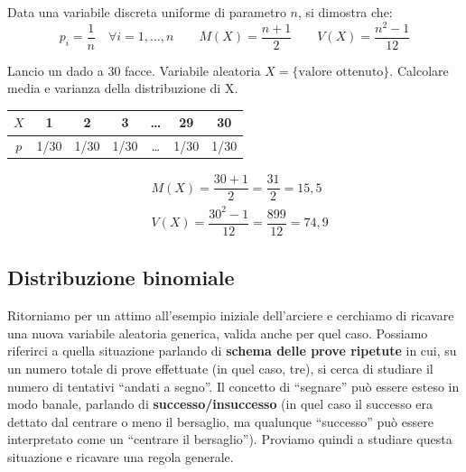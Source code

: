 \begin{esempio}
\begin{proprieta} Data una variabile discreta uniforme di parametro \(n\), si dimostra che: 
\[\boxed{p_i = \dfrac{1}{n} \quad \forall i=1,\dots,n} \qquad \boxed{M(X) = \dfrac{n+1}{2}} \qquad \boxed{V(X) = \dfrac{n^2-1}{12}}\]
\end{proprieta}

\begin{esercizio} Lancio un dado a 30 facce. Variabile aleatoria \(X=\{\text{valore ottenuto}\}\). Calcolare media e varianza della distribuzione di X.\\[6pt]
\begin{minipage}[c]{.6\textwidth}
\begin{center}
 \renewcommand\arraystretch{1.4}
\setlength\arraycolsep{22pt}
\begin{tabular}{c|c|c|c|c|c|c}
\(X\) & 1 & 2 & 3 &  \dots &29&30\\
\hline
\(p\) &1/30 & 1/30 & 1/30 &\dots & 1/30& 1/30 \\
\end{tabular}
\end{center}

\end{minipage}
\begin{minipage}[c]{.4\textwidth}
\[\begin{split} &M(X) = \dfrac{30+1}{2} = \dfrac{31}{2}=15,5 \\
 &V(X)= \dfrac{30^2-1}{12} = \dfrac{899}{12}=74,9
\end{split}\]
\end{minipage}
\end{esercizio}


\end{esempio}
\subsection{Distribuzione binomiale}

Ritorniamo per un attimo all'esempio iniziale dell'arciere e cerchiamo di ricavare una nuova variabile aleatoria generica, valida anche per quel caso. Possiamo riferirci a quella situazione parlando di \textbf{schema delle prove ripetute} in cui, su un numero totale di prove effettuate (in quel caso, tre), si cerca di studiare il numero di tentativi ``andati a segno''. Il concetto di ``segnare'' può essere esteso in modo banale, parlando di \textbf{successo/insuccesso} (in quel caso il successo era dettato dal centrare o meno il bersaglio, ma qualunque ``successo'' può essere interpretato come un ``centrare il bersaglio''). Proviamo quindi a studiare questa situazione e ricavare una regola generale.

